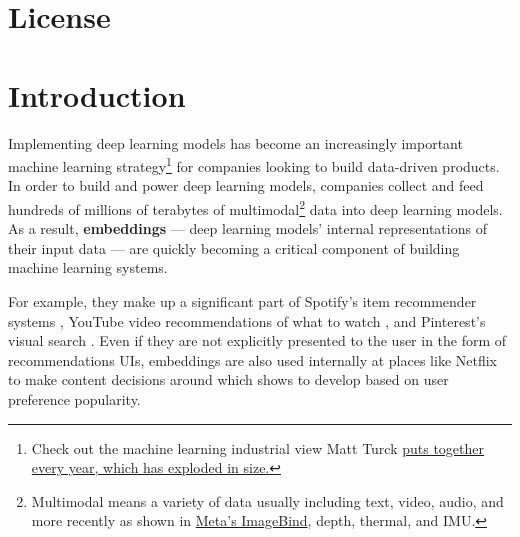 \documentclass[11pt, table]{diazessay} %
\begin{document}
\begin{sloppypar}
\section*{License}
\doclicenseThis
\newpage

\tableofcontents
\newpage


\section{Introduction}

Implementing deep learning models has become an increasingly important machine learning strategy\footnote{Check out the machine learning industrial view Matt Turck \href{https://mattturck.com/mad2023/}{puts together every year, which has exploded in size.}} for companies looking to build data-driven products. In order to build and power deep learning models, companies collect and feed hundreds of millions of terabytes of multimodal\footnote{Multimodal means a variety of data usually including text, video, audio, and more recently as shown in \href{https://ai.facebook.com/blog/imagebind-six-modalities-binding-ai/}{Meta's ImageBind}, depth, thermal, and IMU.} data into deep learning models. As a result, \textbf{embeddings} --- deep learning models' internal representations of their input data --- are quickly becoming a critical component of building machine learning systems.

For example, they make up a significant part of Spotify's item recommender systems \citep{hansen2020contextual}, YouTube video recommendations of what to watch \citep{covington2016deep}, and Pinterest's visual search \citep{jing2015visual}. Even if they are not explicitly presented to the user in the form of recommendations UIs, embeddings are also used internally at places like Netflix to make content decisions around which shows to develop based on user preference popularity.


\end{sloppypar}
\end{document}
